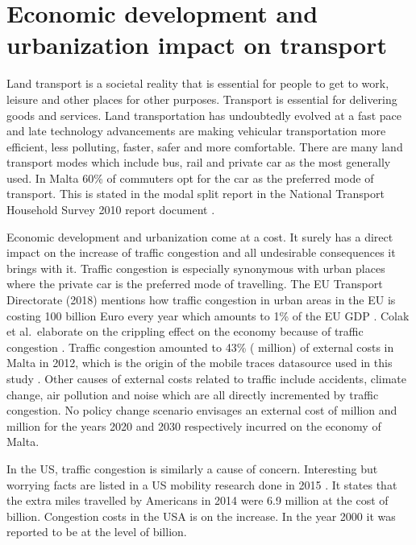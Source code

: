 \documentclass[12pt, a4paper]{report}
\theoremstyle{definition}
\theoremstyle{definition}%
\theoremstyle{definition}%
\theoremstyle{definition}%
\theoremstyle{definition}%
\theoremstyle{definition}%
\begin{document}
\section{Economic development and urbanization impact on transport} \label{section:introduction:economic_development}

Land transport is a societal reality that is essential for people to get to work, leisure and other places for other purposes. Transport is essential for delivering goods and services. Land transportation has undoubtedly evolved at a fast pace and late technology advancements are making vehicular transportation more efficient, less polluting, faster, safer and more comfortable. There are many land transport modes which include bus, rail and private car as the most generally used. In Malta 60\% of commuters opt for the car as the preferred mode of transport. This is stated in the modal split report in the National Transport Household Survey 2010 report document  \cite{malta2011national}.

Economic development and urbanization come at a cost. It surely has a direct impact on the increase of traffic congestion and all undesirable consequences it brings with it. Traffic congestion is especially synonymous with urban places where the private car is the preferred mode of travelling. The EU Transport Directorate (2018) mentions how traffic congestion in urban areas in the EU is costing 100 billion Euro every year which amounts to 1\% of the EU GDP \cite{EUTransportDirectorate2018}. Colak et al.\ elaborate on the crippling effect on the economy because of traffic congestion \cite{Colak2015}. Traffic congestion amounted to 43\% ( million) of external costs in Malta in 2012, which is the origin of the mobile traces datasource used in this study \cite{Attard2015}. Other causes of external costs related to traffic include accidents, climate change, air pollution and noise which are all directly incremented by traffic congestion. No policy change scenario envisages an external cost of  million and  million for the years 2020 and 2030 respectively incurred on the economy of Malta.

In the US, traffic congestion is similarly a cause of concern. Interesting but worrying facts are listed in a US mobility research done in 2015 \cite{Schrank.2015}. It states that the extra miles travelled by Americans in 2014 were 6.9 million at the cost of  billion. Congestion costs in the USA is on the increase. In the year 2000 it was reported to be at the level of  billion.
\end{document}
